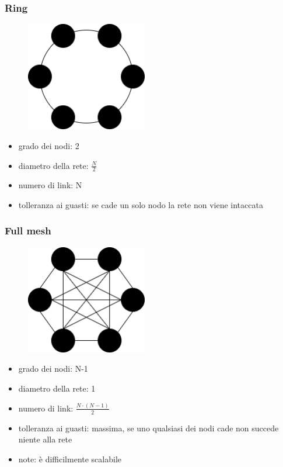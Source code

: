 \subsubsection{Ring}
\begin{figure}[H]
    \centering
    \includegraphics[width=200px]{images/2_Tassonomia_di_Flynn/ring-topology.png}
\end{figure}

\begin{itemize}
    \item grado dei nodi: 2
    \item diametro della rete: $\frac{N}{2}$
    \item numero di link: N
    \item tolleranza ai guasti: se cade un solo nodo la rete non viene intaccata
\end{itemize}

\subsubsection{Full mesh}
\begin{figure}[H]
    \centering
    \includegraphics[width=200px]{images/2_Tassonomia_di_Flynn/full_mesh-topology.png}
\end{figure}

\begin{itemize}
    \item grado dei nodi: N-1
    \item diametro della rete: 1
    \item numero di link: $\frac{N \cdot (N - 1)}{2}$
    \item tolleranza ai guasti: massima, se uno qualsiasi dei nodi cade non succede niente alla rete
    \item note: è difficilmente scalabile
\end{itemize}


